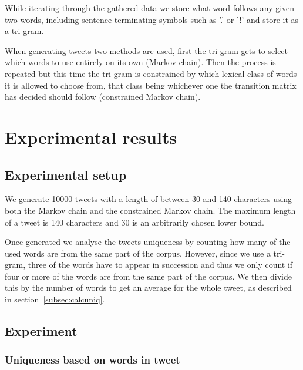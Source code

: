 \documentclass[a4paper,12pt]{article}
\begin{document}
While iterating through the gathered data we store what word follows any given two words, including sentence terminating symbols such as '.' or '!' and store it as a tri-gram.

When generating tweets two methods are used, first the tri-gram gets to select which words to use entirely on its own (Markov chain). Then the process is repeated but this time the tri-gram is constrained by which lexical class of words it is allowed to choose from, that class being whichever one the transition matrix has decided should follow (constrained Markov chain).

\section{Experimental results}
\label{sec:exps}

\subsection{Experimental setup}
We generate 10000 tweets with a length of between 30 and 140 characters using both the Markov chain and the constrained Markov chain.
The maximum length of a tweet is 140 characters and 30 is an arbitrarily chosen lower bound.

Once generated we analyse the tweets uniqueness by counting how many of the used words are from the same part of the corpus. However, since we use a tri-gram, three of the words have to appear in succession and thus we only count if four or more of the words are from the same part of the corpus. We then divide this by the number of words to get an average for the whole tweet, as described in section~\ref{subsec:calcuniq}.

\newpage
\subsection{Experiment}

\subsubsection{Uniqueness based on words in tweet}
\end{document}
